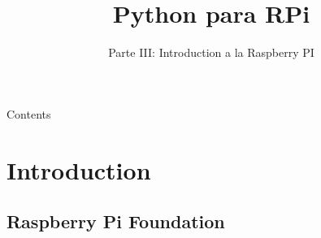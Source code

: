 \documentclass[10pt,colorlinks]{beamer}
\title{ Python para RPi}
\subtitle
{Parte III: Introduction a la Raspberry PI} %
\begin{document}
\begin{frame}[plain]
   \maketitle
\end{frame}


\begin{frame}[allowframebreaks]{Contents}
  \tableofcontents
\end{frame}

\section{Introduction}
\subsection{Raspberry Pi Foundation}
\end{document}

